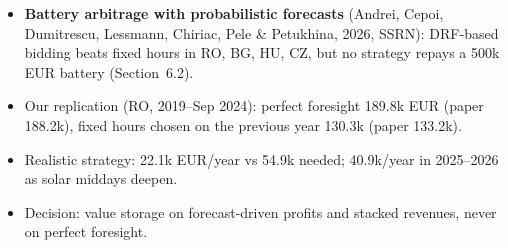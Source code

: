 \begin{itemize}\setlength{\itemsep}{2pt}
  \item \textbf{Battery arbitrage with probabilistic forecasts} (Andrei, Cepoi, Dumitrescu, Lessmann, Chiriac, Pele \& Petukhina, 2026, SSRN): DRF-based bidding beats fixed hours in RO, BG, HU, CZ, but no strategy repays a 500k EUR battery (Section~6.2).
  \item Our replication (RO, 2019--Sep 2024): perfect foresight 189.8k EUR (paper 188.2k), fixed hours chosen on the previous year 130.3k (paper 133.2k).
  \item Realistic strategy: 22.1k EUR/year vs 54.9k needed; 40.9k/year in 2025--2026 as solar middays deepen.
  \item Decision: value storage on forecast-driven profits and stacked revenues, never on perfect foresight.
\end{itemize}

